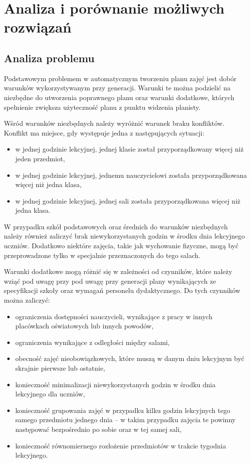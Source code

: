 \chapter{Analiza i porównanie możliwych rozwiązań}
\section{Analiza problemu}
Podstawowym problemem w automatycznym tworzeniu planu zajęć jest dobór warunków wykorzystywanym przy generacji. Warunki te można podzielić na niezbędne do utworzenia poprawnego planu oraz warunki dodatkowe, których spełnienie zwiększa użyteczność planu z punktu widzenia planisty. 

Wśród warunków niezbędnych należy wyróżnić warunek braku konfliktów. Konflikt ma miejsce, gdy występuje jedna z następujących sytuacji:
\begin{itemize}
    \item w jednej godzinie lekcyjnej, jednej klasie został przyporządkowany więcej niż jeden przedmiot,
    \item w jednej godzinie lekcyjnej, jednemu nauczycielowi została przyporządkowana więcej niż jedna klasa,
    \item w jednej godzinie lekcyjnej, jednej sali została przyporządkowana więcej niż jedna klasa.
\end{itemize}
W przypadku szkół podstawowych oraz średnich do warunków niezbędnych należy również zaliczyć brak niewykorzystanych godzin w środku dnia lekcyjnego uczniów. Dodatkowo niektóre zajęcia, takie jak wychowanie fizyczne, mogą być przeprowadzone tylko w specjalnie przeznaczonych do tego salach.

Warunki dodatkowe mogą różnić się w zależności od czynników, które należy wziąć pod uwagę przy pod uwagę przy generacji plany wynikających ze specyfikacji szkoły oraz wymagań personelu dydaktycznego. Do tych czynników można zaliczyć:
\begin{itemize}
    \item ograniczenia dostępności nauczycieli, wynikające z pracy w innych placówkach oświatowych lub innych powodów,
    \item ograniczenia wynikające z odległości między salami,
    \item obecność zajęć nieobowiązkowych, które muszą w danym dniu lekcyjnym być skrajnie pierwsze lub ostatnie,
    \item  konieczność minimalizacji niewykorzystanych godzin w środku dnia lekcyjnego dla uczniów,
    \item konieczność grupowania zajęć w przypadku kilku godzin lekcyjnych tego samego przedmiotu jednego dnia -- w takim przypadku zajęcia te powinny następować bezpośrednio po sobie oraz w tej samej sali,
    \item konieczność równomiernego rozłożenie przedmiotów w trakcie tygodnia lekcyjnego.
\end{itemize}
